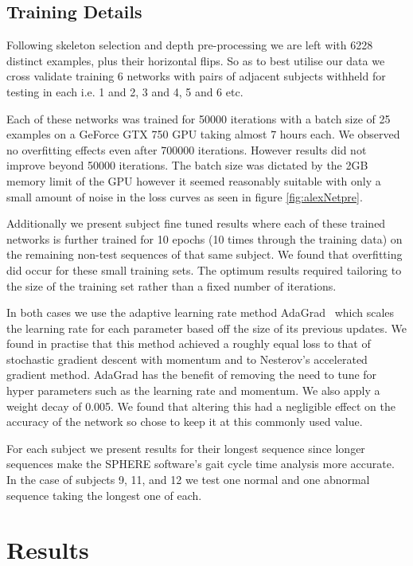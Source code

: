 \documentclass[11pt]{article} %
\begin{document}
\subsection{Training Details}


Following skeleton selection and depth pre-processing we are left with 6228 distinct examples, plus their horizontal flips. So as to best utilise our data we cross validate training 6 networks with pairs of adjacent subjects withheld for testing in each i.e. 1 and 2, 3 and 4, 5 and 6 etc. 

Each of these networks was trained for 50000 iterations with a batch size of 25 examples on a GeForce GTX 750 GPU taking almost 7 hours each. We observed no overfitting effects even after 700000 iterations. However results did not improve beyond 50000 iterations. The batch size was dictated by the 2GB memory limit of the GPU however it seemed reasonably suitable with only a small amount of noise in the loss curves as seen in figure \ref{fig:alexNetpre}.

Additionally we present subject fine tuned results where each of these trained networks is further trained for 10 epochs (10 times through the training data) on the remaining non-test sequences of that same subject. We found that overfitting did occur for these small training sets. The optimum results required tailoring to the size of the training set rather than a fixed number of iterations. 

In both cases we use the adaptive learning rate method AdaGrad~\cite{Duchi2011} which scales the learning rate for each parameter based off the size of its previous updates. We found in practise that this method achieved a roughly equal loss to that of stochastic gradient descent with momentum and to Nesterov's accelerated gradient method. AdaGrad has the benefit of removing the need to tune for hyper parameters such as the learning rate and momentum. We also apply a weight decay of 0.005. We found that altering this had a negligible effect on the accuracy of the network so chose to keep it at this commonly used value.

For each subject we present results for their longest sequence since longer sequences make the SPHERE software's gait cycle time analysis more accurate. In the case of subjects 9, 11, and 12 we test one normal and one abnormal sequence taking the longest one of each. 

\section{Results}
\label{sec:results}
\end{document}
